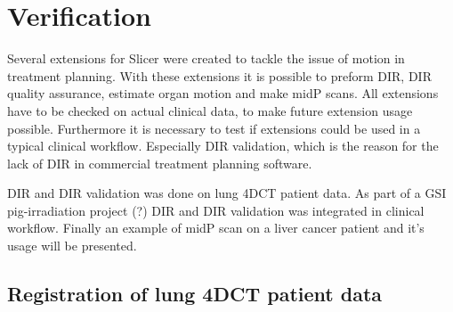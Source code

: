 \documentclass[type=dr, dr=rernat, accentcolor=tud7b,colorbacktitle, bigchapter, openright, twoside, 12pt ]{tudthesis}
\begin{document}
% 
% 


\newpage
\section{Verification}
\label{Verification}

Several extensions for Slicer were created to tackle the issue of motion in treatment planning. With these extensions it is possible to preform DIR, DIR quality assurance, estimate organ motion and make midP scans. All extensions have to be checked on actual clinical data, to make future extension usage possible. Furthermore it is necessary to test if extensions could be used in a typical clinical workflow. Especially DIR validation, which is the reason for the lack of DIR in commercial treatment planning software. 

DIR and DIR validation was done on lung 4DCT patient data. As part of a GSI pig-irradiation project (?) DIR and DIR validation was integrated in clinical workflow. Finally an example of midP scan on a liver cancer patient and it's usage will be presented.

\subsection{Registration of lung 4DCT patient data}
\label{lungDIR}
\end{document}
